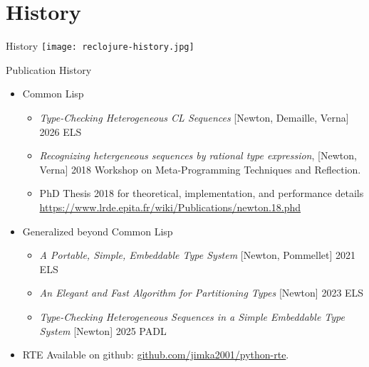 \section{History}
{  %
\begin{frame}{History}
  \centering
  \texttt{[image: reclojure-history.jpg]}
\end{frame}
}
\begin{frame}{Publication History}
  \begin{itemize}
  \item Common Lisp
    
    \begin{itemize}
    \item \textit{Type-Checking Heterogeneous CL Sequences} [Newton, Demaille, Verna] 2026 ELS
    \item \textit{Recognizing hetergeneous sequences by rational type
      expression}, [Newton, Verna] 2018 Workshop on Meta-Programming
      Techniques and Reflection.
    \item PhD Thesis 2018 for theoretical, implementation, and performance details
      \url{https://www.lrde.epita.fr/wiki/Publications/newton.18.phd}
      
    \end{itemize}
  \item Generalized beyond Common Lisp
    \begin{itemize}
    \item \textit{A Portable, Simple, Embeddable Type System} [Newton, Pommellet] 2021 ELS
      
    \item \textit{An Elegant and Fast Algorithm for Partitioning Types} [Newton] 2023 ELS
    \item \textit{Type-Checking Heterogeneous Sequences in a Simple Embeddable Type System} [Newton] 2025 PADL
    \end{itemize}
  \item   RTE Available on github: \url{github.com/jimka2001/python-rte}.
  \end{itemize}
\end{frame}


